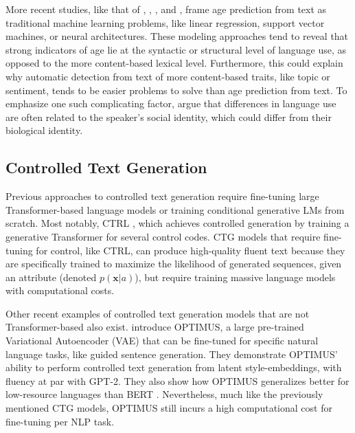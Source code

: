 More recent studies, like that of \cite{nguyen-etal-2011-author}, \cite{nguyen2014gender}, \cite{zheng2019personalized}, and \cite{abdallah2020age}, frame age prediction from text as traditional machine learning problems, like linear regression, support vector machines, or neural architectures. These modeling approaches tend to reveal that strong indicators of age lie at the syntactic or structural level of language use, as opposed to the more content-based lexical level. Furthermore, this could explain why automatic detection from text of more content-based traits, like topic or sentiment, tends to be easier problems to solve than age prediction from text. To emphasize one such complicating factor, \cite{nguyen2014gender} argue that differences in language use are often related to the speaker's social identity, which could differ from their biological identity. 


\subsection{Controlled Text Generation}
Previous approaches to controlled text generation require fine-tuning large Transformer-based language models or training conditional generative LMs from scratch. Most notably, CTRL \citep{keskarCTRL2019}, which achieves controlled generation by training a generative Transformer for several control codes. CTG models that require fine-tuning for control, like CTRL, can produce high-quality fluent text because they are specifically trained to maximize the likelihood of generated sequences, given an attribute (denoted $p(\textbf{x} | a)$), but require training massive language models with computational costs.

Other recent examples of controlled text generation models that are not Transformer-based also exist. \cite{li-etal-2020-optimus} introduce OPTIMUS, a large pre-trained Variational Autoencoder (VAE) \citep{Kingma2014} that can be fine-tuned for specific natural language tasks, like guided sentence generation. They demonstrate OPTIMUS' ability to perform controlled text generation from latent style-embeddings, with fluency at par with GPT-2. They also show how OPTIMUS generalizes better for low-resource languages than BERT \citep{devlin-etal-2019-bert}. Nevertheless, much like the previously mentioned CTG models, OPTIMUS still incurs a high computational cost for fine-tuning per NLP task.

